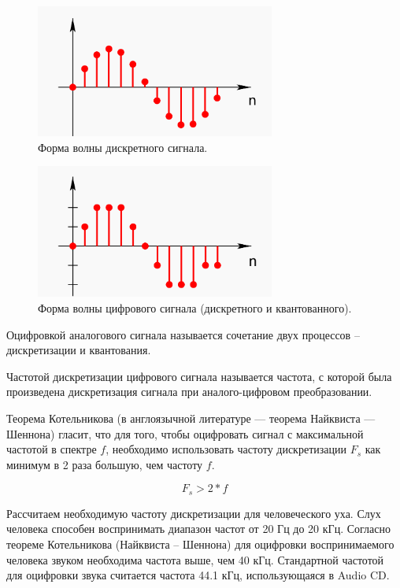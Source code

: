 \begin{figure}[H]
	\centering
	\includegraphics [width=0.7\textwidth] {images/lab_7/discrete.png}
	\caption{Форма волны дискретного сигнала.}
	\label{lab7:pic2}
\end{figure}


\begin{figure}[H]
	\centering
	\includegraphics [width=0.7\textwidth] {images/lab_7/digital.png}
	\caption{Форма волны цифрового сигнала (дискретного и квантованного).}
	\label{lab7:pic3}
\end{figure}

Оцифровкой аналогового сигнала называется сочетание двух процессов -- дискретизации и квантования.

Частотой дискретизации цифрового сигнала называется частота, с которой была произведена дискретизация сигнала при аналого-цифровом преобразовании.

Теорема Котельникова (в англоязычной литературе — теорема Найквиста — Шеннона) гласит, что для того, чтобы оцифровать сигнал с максимальной частотой в спектре $f$, необходимо использовать частоту дискретизации $F_s$ как минимум в 2 раза большую, чем частоту $f$.

$$ F_s > 2*f $$

Рассчитаем необходимую частоту дискретизации для человеческого уха.
Слух человека способен воспринимать диапазон частот от 20 Гц до 20 кГц.
Согласно теореме Котельникова (Найквиста -- Шеннона) для оцифровки воспринимаемого человека звуком необходима частота выше, чем 40 кГц. Стандартной частотой для оцифровки звука считается частота 44.1 кГц, использующаяся в Audio CD.


